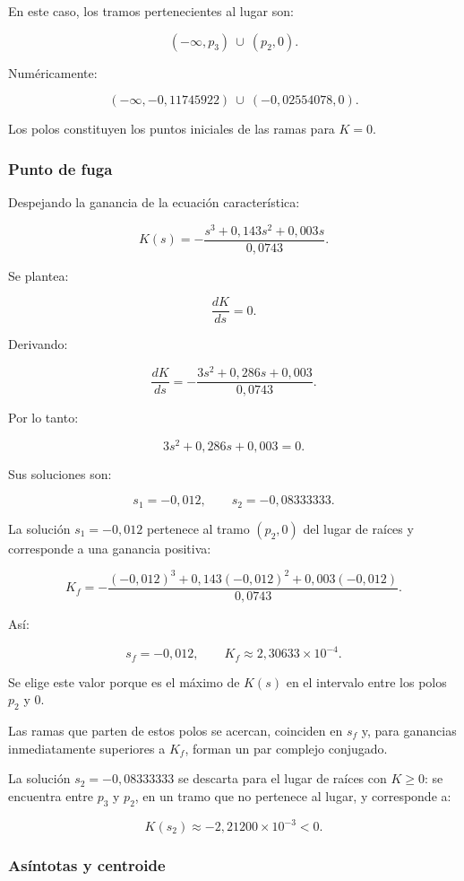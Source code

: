 \documentclass[12pt,a4paper]{article}
\begin{document}
En este caso, los tramos pertenecientes al lugar son:

\[
\boxed{
(-\infty,p_3)\ \cup\ (p_2,0).
}
\]

Numéricamente:

\[
(-\infty,-0{,}11745922)
\ \cup\
(-0{,}02554078,0).
\]

Los polos constituyen los puntos iniciales de las ramas
para $K=0$.


\subsubsection*{Punto de fuga}

Despejando la ganancia de la ecuación característica:

\[
K(s)
=
-\frac{
s^3+0{,}143s^2+0{,}003s
}{
0{,}0743
}.
\]

Se plantea:

\[
\frac{dK}{ds}=0.
\]

Derivando:

\[
\frac{dK}{ds}
=
-\frac{
3s^2+0{,}286s+0{,}003
}{
0{,}0743
}.
\]

Por lo tanto:

\[
3s^2+0{,}286s+0{,}003=0.
\]

Sus soluciones son:

\[
s_1=-0{,}012,
\qquad
s_2=-0{,}08333333.
\]

La solución $s_1=-0{,}012$ pertenece al tramo
$(p_2,0)$ del lugar de raíces y corresponde
a una ganancia positiva:

\[
K_f
=
-\frac{
(-0{,}012)^3
+
0{,}143(-0{,}012)^2
+
0{,}003(-0{,}012)
}{
0{,}0743
}.
\]

Así:

\[
\boxed{
s_f=-0{,}012,
\qquad
K_f\approx2{,}30633\times10^{-4}.
}
\]

Se elige este valor porque es el máximo de $K(s)$
en el intervalo entre los polos $p_2$ y $0$.

Las ramas que parten de estos polos se acercan,
coinciden en $s_f$ y, para ganancias inmediatamente
superiores a $K_f$, forman un par complejo conjugado.

La solución $s_2=-0{,}08333333$ se descarta para
el lugar de raíces con $K\geq0$: se encuentra
entre $p_3$ y $p_2$, en un tramo que no pertenece
al lugar, y corresponde a:

\[
K(s_2)
\approx
-2{,}21200\times10^{-3}<0.
\]


\subsubsection*{Asíntotas y centroide}
\end{document}
